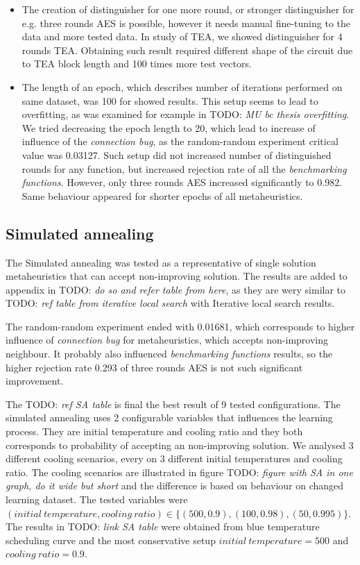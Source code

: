 \documentclass[
  print, %
  Table,   %
  nolof,     %
  nolot,     %
  11pt, %
  oneside  %
]{fithesis3}
\newcommand{\todo}[1]{TODO: \textit{#1}}
\begin{document}
\begin{itemize}
    \item The creation of distinguisher for one more round, or stronger distinguisher for e.g. three rounds AES is possible, however it needs manual fine-tuning to the data and more tested data. In study of TEA\cite{kubicek2016new}, we showed distinguisher for 4 rounds TEA. Obtaining such result required different shape of the circuit due to TEA block length and 100 times more test vectors.
    \item The length of an epoch, which describes number of iterations performed on same dataset, was 100 for showed results. This setup seems to lead to overfitting, as was examined for example in \todo{MU bc thesis overfitting}. We tried decreasing the epoch length to 20, which lead to increase of influence of the \textit{connection bug}, as the random-random experiment critical value was 0.03127. Such setup did not increased number of distinguished rounds for any function, but increased rejection rate of all the \textit{benchmarking functions}. However, only three rounds AES increased significantly to 0.982. Same behaviour appeared for shorter epochs of all metaheuristics.
\end{itemize}


\subsection{Simulated annealing}

The Simulated annealing was tested as a representative of single solution metaheuristics that can accept non-improving solution. The results are added to appendix in \todo{do so and refer table from here}, as they are wery similar to \todo{ref table from iterative local search} with Iterative local search results.

The random-random experiment ended with 0.01681, which corresponds to higher influence of \textit{connection bug} for metaheuristics, which accepts non-improving neighbour. It probably also influenced \textit{benchmarking functions} results, so the higher rejection rate 0.293 of three rounds AES is not such significant improvement.

The \todo{ref SA table} is final the best result of 9 tested configurations. The simulated annealing uses 2 configurable variables that influences the learning process. They are initial temperature and cooling ratio and they both corresponds to probability of accepting an non-improving solution. We analysed 3 different cooling scenarios, every on 3 different initial temperatures and cooling ratio. The cooling scenarios are illustrated in figure \todo{figure with SA in one graph, do it wide but short} and the difference is based on behaviour on changed learning dataset. The tested variables were $(\mathit{initial~temperature, cooling~ratio}) \in \{ (500, 0.9), (100, 0.98), (50, 0.995) \}$. The results in \todo{link SA table} were obtained from blue temperature scheduling curve and the most conservative setup $\mathit{initial~temperature} = 500$ and $\mathit{cooling~ratio} = 0.9$.
\end{document}
